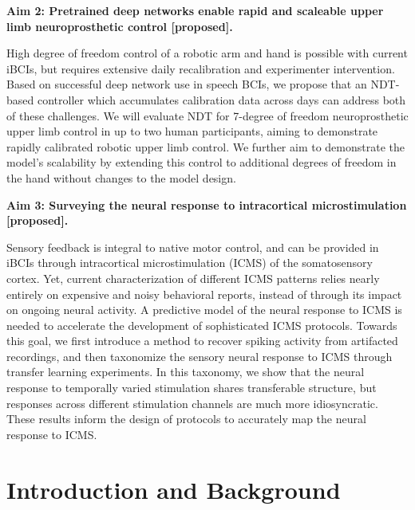 \documentclass[12pt,oneside]{report}
\begin{document}
\textbf{Aim 2: Pretrained deep networks enable rapid and scaleable upper limb neuroprosthetic control [proposed].}

High degree of freedom control of a robotic arm and hand is possible with current iBCIs, but requires extensive daily recalibration and experimenter intervention. Based on successful deep network use in speech BCIs, we propose that an NDT-based controller which accumulates calibration data across days can address both of these challenges. We will evaluate NDT for 7-degree of freedom neuroprosthetic upper limb control in up to two human participants, aiming to demonstrate rapidly calibrated robotic upper limb control. We further aim to demonstrate the model’s scalability by extending this control to additional degrees of freedom in the hand without changes to the model design.

\textbf{Aim 3: Surveying the neural response to intracortical microstimulation [proposed].}

Sensory feedback is integral to native motor control, and can be provided in iBCIs through intracortical microstimulation (ICMS) of the somatosensory cortex. Yet, current characterization of different ICMS patterns relies nearly entirely on expensive and noisy behavioral reports, instead of through its impact on ongoing neural activity. A predictive model of the neural response to ICMS is needed to accelerate the development of sophisticated ICMS protocols. Towards this goal, we first introduce a method to recover spiking activity from artifacted recordings, and then taxonomize the sensory neural response to ICMS through transfer learning experiments. In this taxonomy, we show that the neural response to temporally varied stimulation shares transferable structure, but responses across different stimulation channels are much more idiosyncratic. These results inform the design of protocols to accurately map the neural response to ICMS.

\tableofcontents

\cleardoublepage

\chapter{Introduction and Background}
\end{document}
